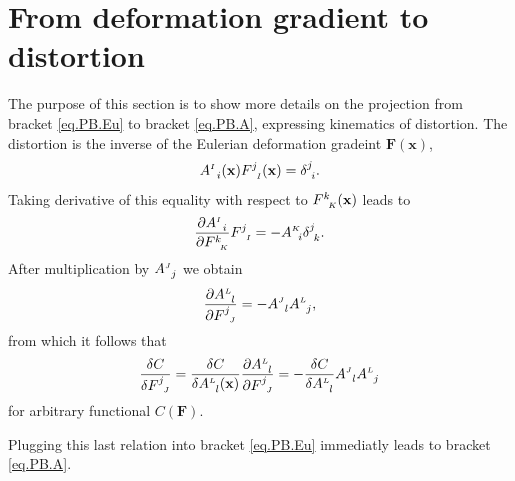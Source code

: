 \documentclass[
10pt, %
a4paper, %
oneside, %
headinclude,footinclude, %
BCOR5mm, %
]{scrartcl}
\newcommand{\xx}{\mathbf{x}}
\newcommand{\FF}{\mathbf{F}}
\newcommand{\F}[2]{F^{#1}_{\ \, \mathsmaller#2}}
\newcommand{\A}[2]{A^{\mathsmaller#1}_{\ \, #2}}
\begin{document}
\section{From deformation gradient to distortion}\label{sec.F-A}
The purpose of this section is to show more details on the projection from bracket \eqref{eq.PB.Eu} to bracket \eqref{eq.PB.A}, expressing kinematics of distortion. The distortion is the inverse of the Eulerian deformation gradeint $\FF(\xx)$, 
\begin{equation}
	\A{I}{i}(\xx) \F{j}{I}(\xx) = \delta^j_{\ i}.
\end{equation}
Taking derivative of this equality with respect to $\F{k}{K}(\xx)$ leads to
\begin{equation}
	\frac{\partial \A{I}{i}}{\partial \F{k}{K}} \F{j}{I} = -\A{K}{i} \delta^j_{\ k}.
\end{equation}
After multiplication by $\A{J}{j}$ we obtain
\begin{equation}\label{app.eq.dAdF}
	\frac{\partial \A{L}{l}}{\partial \F{j}{J}} = -\A{J}{l} \A{L}{j},
\end{equation}
from which it follows that 
\begin{equation}
	\frac{\delta C}{\delta \F{j}{J}} = \frac{\delta C}{\delta \A{L}{l}(\xx)} \frac{\partial 
	\A{L}{l}}{\partial \F{j}{J}} = -\frac{\delta C}{\delta \A{L}{l}} \A{J}{l} \A{L}{j}
\end{equation}
for arbitrary functional $C(\FF)$.

Plugging this last relation into bracket \eqref{eq.PB.Eu} immediatly leads to bracket \eqref{eq.PB.A}.
\end{document}

